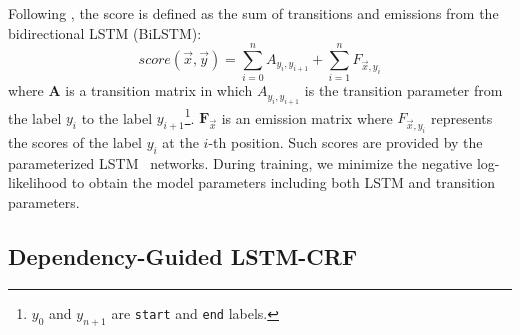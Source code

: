 Following \citet{lample2016neural}, the score is defined as the sum of transitions and emissions from the bidirectional LSTM (BiLSTM): 
\begin{equation}
score(\vec{x} , \vec{y}) = \sum_{i=0}^n A_{y_i, y_{i+1}} + \sum_{i=1}^n F_{\vec{x}, y_i}
\end{equation}
where $\mathbf{A}$ is a transition matrix in which $A_{y_i, y_{i+1}}$ is the transition parameter from the label $y_i$ to the label $y_{i+1}$\footnote{$y_0$ and $y_{n+1}$ are \texttt{start} and \texttt{end} labels.}. 
$\mathbf{F}_\vec{x}$ is an emission matrix where $F_{\vec{x}, y_i}$ represents the scores of the label  $y_i$ at the $i$-th position. 
Such scores are provided by the parameterized LSTM~\cite{hochreiter1997long} networks. 
During training, we minimize the negative log-likelihood to obtain the model parameters including both LSTM and transition parameters. 



\subsection{Dependency-Guided LSTM-CRF}
